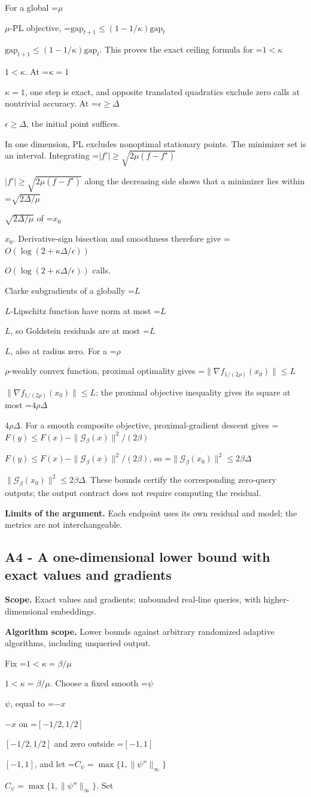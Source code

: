 \documentclass[10pt,a4paper]{article}
\newcommand{\AtlasMath}[1]{\par\begingroup\centering\setbox0=\hbox{$\displaystyle #1$}\ifdim\wd0>1.4\linewidth\typeout{ATLAS WIDE FORMULA: \the\wd0}\fi\ifdim\wd0>\linewidth\resizebox{\linewidth}{!}{\box0}\else\box0\fi\par\endgroup}
\newcommand{\AtlasInlineMath}[1]{\begingroup\setbox0=\hbox{$#1$}\ifdim\wd0>.4\linewidth\endgroup\AtlasMath{#1}\else\endgroup$#1$\fi}
\begin{document}
For a global \AtlasInlineMath{\mu}-PL objective,
\AtlasInlineMath{\mathrm{gap}_{t+1}\le(1-1/\kappa)\mathrm{gap}_t}.
This proves the exact ceiling formula for \AtlasInlineMath{1<\kappa}. At \AtlasInlineMath{\kappa=1}, one step is exact, and opposite translated quadratics exclude zero calls at nontrivial accuracy. At \AtlasInlineMath{\epsilon\ge\Delta}, the initial point suffices.

In one dimension, PL excludes nonoptimal stationary points. The minimizer set is an interval. Integrating
\AtlasInlineMath{|f'|\ge\sqrt{2\mu(f-f^\star)}}
along the decreasing side shows that a minimizer lies within \AtlasInlineMath{\sqrt{2\Delta/\mu}} of \AtlasInlineMath{x_0}. Derivative-sign bisection and smoothness therefore give \AtlasInlineMath{O(\log(2+\kappa\Delta/\epsilon))} calls.

Clarke subgradients of a globally \AtlasInlineMath{L}-Lipschitz function have norm at most \AtlasInlineMath{L}, so Goldstein residuals are at most \AtlasInlineMath{L}, also at radius zero. For a \AtlasInlineMath{\rho}-weakly convex function, proximal optimality gives
\AtlasInlineMath{\|\nabla f_{1/(2\rho)}(x_0)\|\le L}; the proximal objective inequality gives its square at most \AtlasInlineMath{4\rho\Delta}.
For a smooth composite objective, proximal-gradient descent gives
\AtlasInlineMath{F(y)\le F(x)-\|\mathcal G_\beta(x)\|^2/(2\beta)},
so \AtlasInlineMath{\|\mathcal G_\beta(x_0)\|^2\le2\beta\Delta}.
These bounds certify the corresponding zero-query outputs; the output contract does not require computing the residual.

\textbf{Limits of the argument.} Each endpoint uses its own residual and model; the metrics are not interchangeable.

\subsection{A4 - A one-dimensional lower bound with exact values and gradients}
\textbf{Scope.} Exact values and gradients; unbounded real-line queries, with higher-dimensional embeddings.

\textbf{Algorithm scope.} Lower bounds against arbitrary randomized adaptive algorithms, including unqueried output.

Fix \AtlasInlineMath{1<\kappa=\beta/\mu}. Choose a fixed smooth \AtlasInlineMath{\psi}, equal to \AtlasInlineMath{-x} on \AtlasInlineMath{[-1/2,1/2]} and zero outside \AtlasInlineMath{[-1,1]}, and let \AtlasInlineMath{C_\psi=\max\{1,\|\psi''\|_\infty\}}. Set
\end{document}

